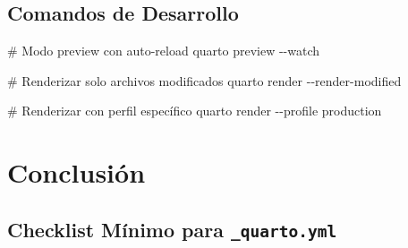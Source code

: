 \documentclass[
  doc,
  floatsintext,
  longtable,
  a4paper,
  nolmodern,
  notxfonts,
  notimes,
  12pt,
  colorlinks=true,linkcolor=blue,citecolor=blue,urlcolor=blue]{apa7}
\newenvironment{Shaded}{\begin{snugshade}}{\end{snugshade}}
\newcommand{\AttributeTok}[1]{\textcolor[rgb]{0.40,0.45,0.13}{#1}}
\newcommand{\CommentTok}[1]{\textcolor[rgb]{0.37,0.37,0.37}{#1}}
\newcommand{\ExtensionTok}[1]{\textcolor[rgb]{0.00,0.23,0.31}{#1}}
\newcommand{\NormalTok}[1]{\textcolor[rgb]{0.00,0.23,0.31}{#1}}
\begin{document}
\subsection{Comandos de Desarrollo}\label{comandos-de-desarrollo}

\begin{Shaded}
\begin{Highlighting}[]
\CommentTok{\# Modo preview con auto{-}reload}
\ExtensionTok{quarto}\NormalTok{ preview }\AttributeTok{{-}{-}watch}

\CommentTok{\# Renderizar solo archivos modificados}
\ExtensionTok{quarto}\NormalTok{ render }\AttributeTok{{-}{-}render{-}modified}

\CommentTok{\# Renderizar con perfil específico}
\ExtensionTok{quarto}\NormalTok{ render }\AttributeTok{{-}{-}profile}\NormalTok{ production}
\end{Highlighting}
\end{Shaded}

\section{Conclusión}\label{conclusiuxf3n}

\subsection{\texorpdfstring{Checklist Mínimo para
\texttt{\_quarto.yml}}{Checklist Mínimo para \_quarto.yml}}\label{checklist-muxednimo-para-_quarto.yml}
\end{document}
